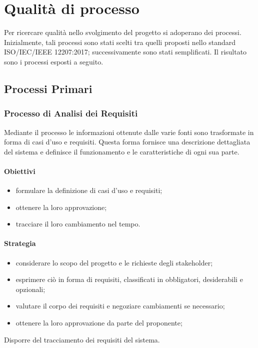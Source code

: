 \section{Qualità di processo}
Per ricercare qualità nello svolgimento del progetto si adoperano dei processi. Inizialmente, tali processi sono stati scelti tra quelli proposti nello standard ISO/IEC/IEEE 12207:2017; successivamente sono stati semplificati.\newline 
Il risultato sono i processi esposti a seguito.



\subsection{Processi Primari}
	\subsubsection{Processo di Analisi dei Requisiti}
	Mediante il processo le informazioni ottenute dalle varie fonti sono trasformate in forma di casi d'uso e requisiti.
	Questa forma fornisce una descrizione dettagliata del sistema e definisce il funzionamento e le caratteristiche di ogni sua parte.
		\paragraph{Obiettivi}
		\begin{itemize}
			\item formulare la definizione di casi d'uso e requisiti;
			\item ottenere la loro approvazione;
			\item tracciare il loro cambiamento nel tempo.
		\end{itemize}		
		\paragraph{Strategia}
		\begin{itemize}
			\item considerare lo scopo del progetto e le richieste degli stakeholder;
			\item esprimere ciò in forma di requisiti, classificati in obbligatori, desiderabili e opzionali;
			\item valutare il corpo dei requisiti e negoziare cambiamenti se necessario;
			\item ottenere la loro approvazione da parte del proponente;
		\end{itemize}
		Disporre del tracciamento dei requisiti del sistema.
